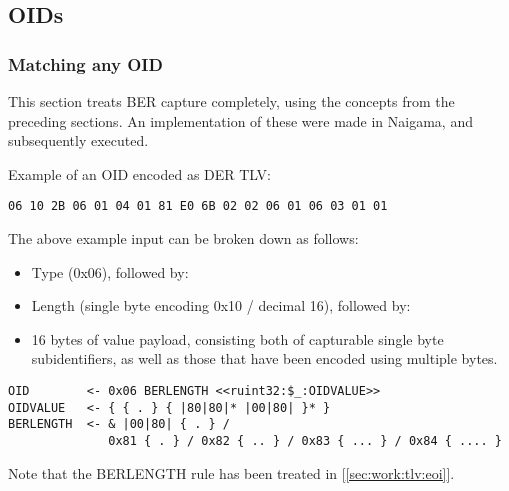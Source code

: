 \subsection{OIDs}

\subsubsection{Matching any OID}

This section treats BER capture completely, using the concepts from the 
preceding sections. An implementation of these were made in Naigama, and 
subsequently executed. 

Example of an OID encoded as DER TLV:

\begin{changemargin}{-60mm}{0mm}
\begin{myquote}
\begin{verbatim}
06 10 2B 06 01 04 01 81 E0 6B 02 02 06 01 06 03 01 01
\end{verbatim}
\end{myquote}
\end{changemargin}

The above example input can be broken down as follows:

\begin{itemize}
    \item Type (0x06), followed by:
    \item Length (single byte encoding 0x10 / decimal 16), followed by:
    \item 16 bytes of value payload, consisting both of capturable single 
byte subidentifiers, as well as those that have been encoded using 
multiple bytes.
\end{itemize}


\begin{changemargin}{-60mm}{0mm}
\begin{myquote}
\begin{verbatim}
OID        <- 0x06 BERLENGTH <<ruint32:$_:OIDVALUE>>
OIDVALUE   <- { { . } { |80|80|* |00|80| }* }
BERLENGTH  <- & |00|80| { . } /
              0x81 { . } / 0x82 { .. } / 0x83 { ... } / 0x84 { .... }
\end{verbatim}
\end{myquote}
\end{changemargin}

Note that the BERLENGTH rule has been treated in [\ref{sec:work:tlv:eoi}].


